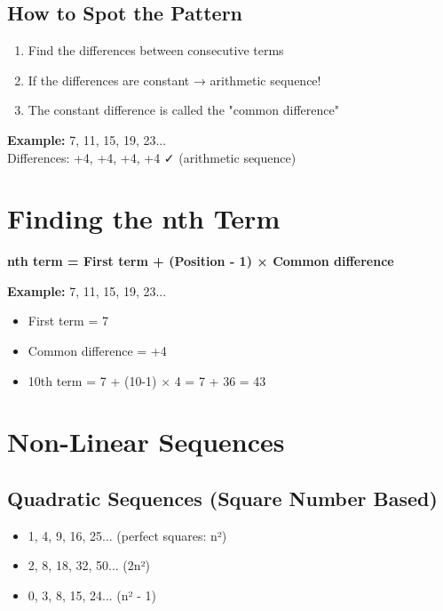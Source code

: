 \documentclass[a4paper,11pt]{article}
\begin{document}
\subsection{How to Spot the Pattern}
\begin{enumerate}
    \item Find the differences between consecutive terms
    \item If the differences are constant → arithmetic sequence!
    \item The constant difference is called the "common difference"
\end{enumerate}

\textbf{Example:} 7, 11, 15, 19, 23...
\\Differences: +4, +4, +4, +4 ✓ (arithmetic sequence)

\section{Finding the nth Term}

\begin{tcolorbox}[colback=orange!5!white,colframe=orange!75!black,title=\textbf{The Formula}]
\textbf{nth term = First term + (Position - 1) × Common difference}
\end{tcolorbox}

\textbf{Example:} 7, 11, 15, 19, 23...
\begin{itemize}
    \item First term = 7
    \item Common difference = +4  
    \item 10th term = 7 + (10-1) × 4 = 7 + 36 = 43
\end{itemize}

\section{Non-Linear Sequences}

\subsection{Quadratic Sequences (Square Number Based)}
\begin{itemize}
    \item 1, 4, 9, 16, 25... (perfect squares: n²)
    \item 2, 8, 18, 32, 50... (2n²)
    \item 0, 3, 8, 15, 24... (n² - 1)
\end{itemize}
\end{document}
